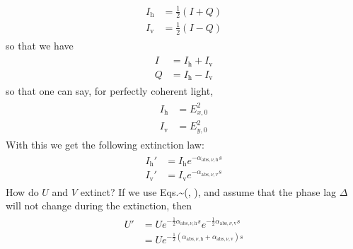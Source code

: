 \documentclass[letterpaper,10pt,english]{sphinxmanual}
\begin{document}
\label{\detokenize{dustradtrans:eq-modif-stokes-hv}}\begin{equation*}
\begin{split}\begin{split}
I_{\mathrm{h}} &= \frac{1}{2}(I+Q)\\
I_{\mathrm{v}} &= \frac{1}{2}(I-Q)
\end{split}\end{split}
\end{equation*}
so that we have
\begin{equation*}
\begin{split}\begin{split}
I &= I_{\mathrm{h}}+I_{\mathrm{v}}\\
Q &= I_{\mathrm{h}}-I_{\mathrm{v}}
\end{split}\end{split}
\end{equation*}
so that one can say, for perfectly coherent light,
\begin{equation*}
\begin{split}\begin{split}
I_{\mathrm{h}} &= E_{x,0}^2\\
I_{\mathrm{v}} &= E_{y,0}^2
\end{split}\end{split}
\end{equation*}
With this we get the following extinction law:
\begin{equation*}
\begin{split}\begin{split}
I_{\mathrm{h}}' &= I_{\mathrm{h}} e^{-\alpha_{\mathrm{abs},\nu,\mathrm{h}}s}\\
I_{\mathrm{v}}' &= I_{\mathrm{v}} e^{-\alpha_{\mathrm{abs},\nu,\mathrm{v}}s}
\end{split}\end{split}
\end{equation*}
How do \(U\) and \(V\) extinct? If we use Eqs.\textasciitilde{}(,
), and assume that the phase lag \(\Delta\) will not
change during the extinction, then
\begin{equation*}
\begin{split}\begin{split}
U' &= U e^{-\tfrac{1}{2}\alpha_{\mathrm{abs},\nu,\mathrm{h}}s} e^{-\tfrac{1}{2}\alpha_{\mathrm{abs},\nu,\mathrm{v}}s}\\
   &= U e^{-\tfrac{1}{2}(\alpha_{\mathrm{abs},\nu,\mathrm{h}}+\alpha_{\mathrm{abs},\nu,\mathrm{v}})s}
\end{split}\end{split}
\end{equation*}
\end{document}

